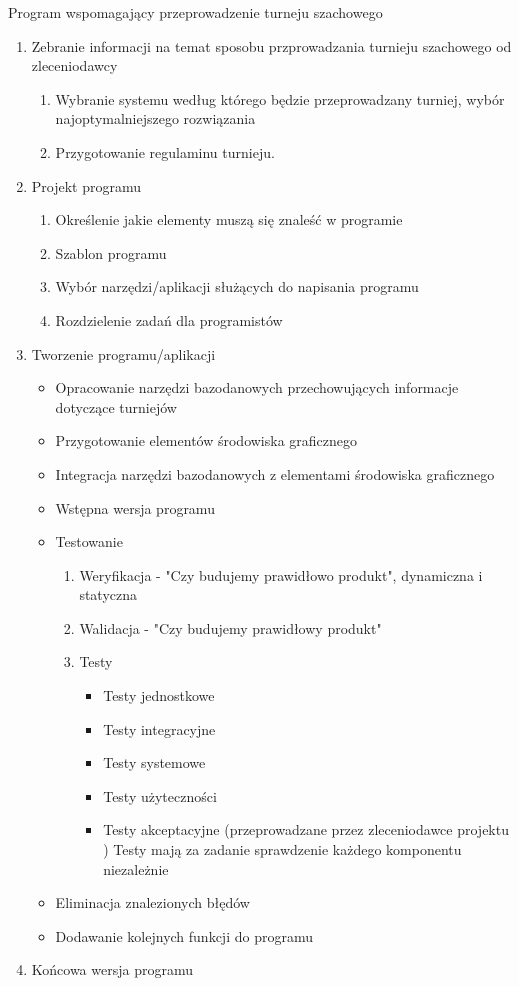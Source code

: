 Program wspomagający przeprowadzenie turneju szachowego
\begin{enumerate}
\item Zebranie informacji na temat sposobu przprowadzania turnieju szachowego od zleceniodawcy
\begin{enumerate}
	\item Wybranie systemu według którego będzie przeprowadzany turniej, wybór najoptymalniejszego rozwiązania
	\item Przygotowanie regulaminu turnieju.
\end{enumerate}
\item Projekt programu
\begin{enumerate}
\item Określenie jakie elementy muszą się znaleść w programie
\item Szablon programu
\item Wybór narzędzi/aplikacji służących do napisania programu
\item Rozdzielenie zadań dla programistów
\end{enumerate}
\item Tworzenie programu/aplikacji
\begin{itemize}
\item Opracowanie narzędzi bazodanowych przechowujących informacje dotyczące turniejów
\item Przygotowanie elementów środowiska graficznego
\item Integracja narzędzi bazodanowych z elementami środowiska graficznego

\item Wstępna wersja programu
\item Testowanie
\begin{enumerate}
	\item Weryfikacja - "Czy budujemy prawidłowo produkt", dynamiczna i statyczna
	\item Walidacja - "Czy budujemy prawidłowy produkt"
	\item Testy
	\begin{itemize}
		\item Testy jednostkowe
		\item Testy integracyjne
		\item Testy systemowe
		\item Testy użyteczności
		\item Testy akceptacyjne (przeprowadzane przez zleceniodawce projektu
	)
	Testy mają za zadanie sprawdzenie każdego komponentu niezależnie
	\end{itemize}
\end{enumerate}
\item Eliminacja znalezionych błędów
\item Dodawanie kolejnych funkcji do programu

\end{itemize}
\item Końcowa wersja programu

\end{enumerate}

